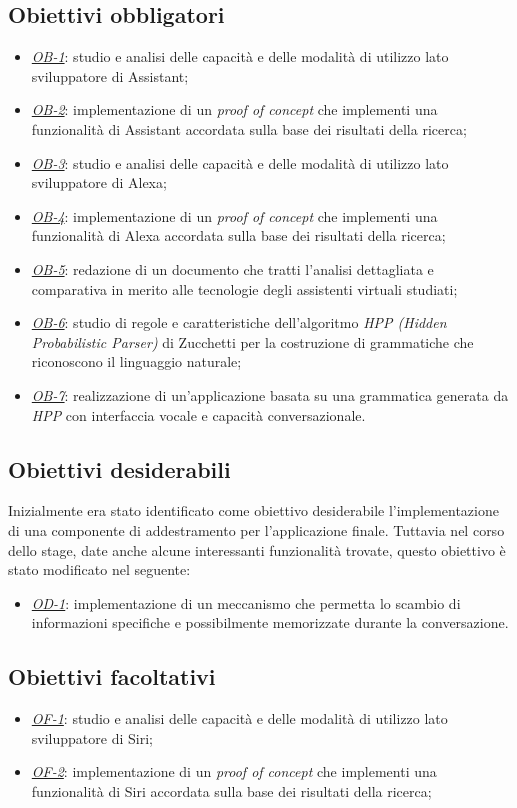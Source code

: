 	\subsection{Obiettivi obbligatori}
	\begin{itemize}
		\item \textit{\underline{OB-1}}: studio e analisi delle capacità e delle modalità di utilizzo lato sviluppatore di Assistant;
		\item \textit{\underline{OB-2}}: implementazione di un \textit{proof of concept} che implementi una funzionalità di Assistant accordata sulla base dei risultati della ricerca;
		\item \textit{\underline{OB-3}}: studio e analisi delle capacità e delle modalità di utilizzo lato sviluppatore di Alexa;
		\item \textit{\underline{OB-4}}: implementazione di un \textit{proof of concept} che implementi una funzionalità di Alexa accordata sulla base dei risultati della ricerca;
		\item \textit{\underline{OB-5}}: redazione di un documento che tratti l'analisi dettagliata e comparativa in merito alle tecnologie degli assistenti virtuali studiati;
		\item \textit{\underline{OB-6}}: studio di regole e caratteristiche dell'algoritmo \textit{HPP (Hidden Probabilistic Parser)} di Zucchetti per la costruzione di grammatiche che riconoscono il linguaggio naturale;
		\item \textit{\underline{OB-7}}: realizzazione di un'applicazione basata su una grammatica generata da \textit{HPP} con interfaccia vocale e capacità conversazionale.
	\end{itemize}
	\subsection{Obiettivi desiderabili}
	Inizialmente era stato identificato come obiettivo desiderabile l'implementazione di una componente di addestramento per l'applicazione finale. Tuttavia nel corso dello stage, date anche alcune interessanti funzionalità trovate, questo obiettivo è stato modificato nel seguente:
	\begin{itemize}
		\item \textit{\underline{OD-1}}: implementazione di un meccanismo che permetta lo scambio di informazioni specifiche e possibilmente memorizzate durante la conversazione.
	\end{itemize}
	\subsection{Obiettivi facoltativi}
	\begin{itemize}
		\item \textit{\underline{OF-1}}: studio e analisi delle capacità e delle modalità di utilizzo lato sviluppatore di Siri;
		\item \textit{\underline{OF-2}}: implementazione di un \textit{proof of concept} che implementi una funzionalità di Siri accordata sulla base dei risultati della ricerca;
	\end{itemize} 

